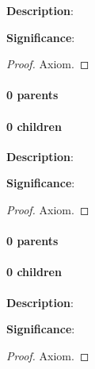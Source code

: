 \documentclass[../main.tex]{subfiles}
\begin{document}
\begin{statement}
\label{statement:Multiplicative Inverse}\hspace*{0pt}\par
\end{statement}
\textbf{Description}:{\color{red} \todo}\par
{\color{magenta} \textbf{Significance}:{\color{red} \todo}\par}
\begin{proof}Axiom.\end{proof}\par
\paragraph{0 parents} 
\paragraph{0 children} 



\begin{statement}
\label{statement:Rational Numbers}\hspace*{0pt}\par
\end{statement}
\textbf{Description}:{\color{red} \todo}\par
{\color{magenta} \textbf{Significance}:{\color{red} \todo}\par}
\begin{proof}Axiom.\end{proof}\par
\paragraph{0 parents} 
\paragraph{0 children} 




\begin{statement}
\label{statement:Irrational Numbers}\hspace*{0pt}\par
\end{statement}
\textbf{Description}:{\color{red} \todo}\par
{\color{magenta} \textbf{Significance}:{\color{red} \todo}\par}
\begin{proof}Axiom.\end{proof}\par
\end{document}
